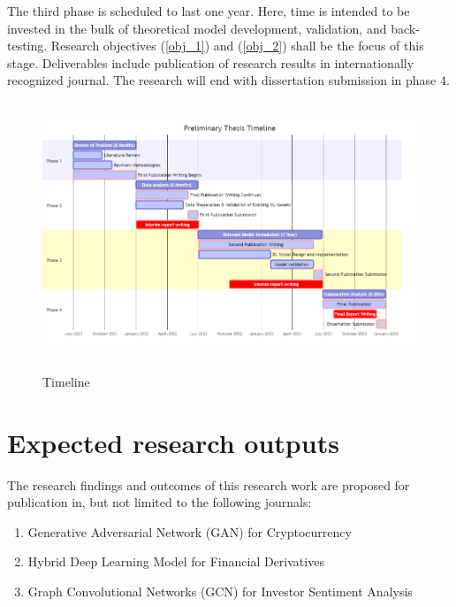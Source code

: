 \documentclass[a4paper,11pt]{scrartcl}
\begin{document}
The third phase is scheduled to last one year. Here, time is intended to be invested in the bulk of theoretical model development, validation, and back-testing. Research objectives (\ref{obj_1}) and (\ref{obj_2}) shall be the focus of this stage. Deliverables include publication of research results in internationally recognized journal. The research will end with dissertation submission in phase 4.
\begin{figure}[htb!]
    \centering
    \includegraphics[width=\textwidth,height=8cm]{graphics/mermaid-diagram-2.png}
    \caption{Timeline}
    \label{fig:my_label}
\end{figure}

\section{Expected research outputs}
The research findings and outcomes of this research work are proposed for publication in, but not limited to the following journals:
\begin{enumerate}
    \item Generative Adversarial Network (GAN) for Cryptocurrency %
    \item Hybrid Deep Learning Model for Financial Derivatives %
    \item Graph Convolutional Networks (GCN) for Investor Sentiment Analysis %
\end{enumerate}



\end{document}
